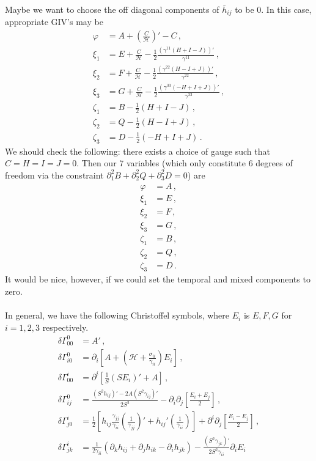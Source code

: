 \documentclass{article}
\newcommand*\scr[1]{\mathscr{#1}}
\newcommand*\p[1]{\left(#1\right)}
\newcommand*\ps[1]{\left[#1\right]}
\newcommand*\f[2]{\frac{#1}{#2}}
\begin{document}
Maybe we want to choose the off diagonal components of $\bar h_{ij}$ to be 0. In this case, appropriate GIV's may be
\begin{align}
\varphi&=A+\p{\f{C}{\scr H}}'-C\,,\\
\xi_1&=E+\f{C}{\scr H}-\f12\f{(\gamma^{11}(H+I-J))'}{\gamma^{11}}\,,\\
\xi_2&=F+\f{C}{\scr H}-\f12\f{(\gamma^{22}(H-I+J))'}{\gamma^{22}}\,,\\
\xi_3&=G+\f{C}{\scr H}-\f12\f{(\gamma^{33}(-H+I+J))'}{\gamma^{33}}\,,\\
\zeta_1&=B-\f12(H+I-J)\,,\\
\zeta_2&=Q-\f12(H-I+J)\,,\\
\zeta_3&=D-\f12(-H+I+J)\,.
\end{align}
We should check the following: there exists a choice of gauge such that $C=H=I=J=0$. Then our 7 variables (which only constitute 6 degrees of freedom via the constraint $\partial_{1}^{2}B+\partial_{2}^{2}Q+\partial_{3}^{2}D=0$) are
\begin{align}
\varphi&=A\,,\\
\xi_1&=E\,,\\
\xi_2&=F\,,\\
\xi_3&=G\,,\\
\zeta_1&=B\,,\\
\zeta_2&=Q\,,\\
\zeta_3&=D\,.
\end{align}
It would be nice, however, if we could set the temporal and mixed components to zero.
\\\\
In general, we have the following Christoffel symbols, where $E_i$ is $E,F,G$ for $i=1,2,3$ respectively.
\begin{align}
\delta\Gamma^0_{00}&=A'\,,\\
\delta\Gamma^0_{i0}&=\partial_i\ps{A+\p{\scr H+\f{\sigma_{ii}}{\gamma_{ii}}}E_i}\,,\\
\delta\Gamma^i_{00}&=\partial^i\ps{\f1S\p{SE_i}'+A}\,,\\
\delta\Gamma^0_{ij}&=\f{\p{S^2 h_{ij}}'-2A\p{S^2\gamma_{ij}}'}{2S^2}-\partial_i\partial_j\ps{\f{E_i+E_j}{2}}\,,\\
\delta\Gamma^i_{j0}&=\f12\ps{h_{ij}\f{\gamma_{jj}}{\gamma_{ii}}\p{\f{1}{\gamma_{jj}}}'+h_{ij}'\p{\f{1}{\gamma_{ii}}}}+\partial^i\partial_j\ps{\f{E_i-E_j}{2}}\,,\\
\delta\Gamma^i_{jk}&=\f{1}{2\gamma_{ii}}\p{\partial_k h_{ij}+\partial_j h_{ik}-\partial_i h_{jk}}-\f{(S^2\gamma_{jk})'}{2S^2\gamma_{ii}}\partial_i E_i
\end{align}
\end{document}
